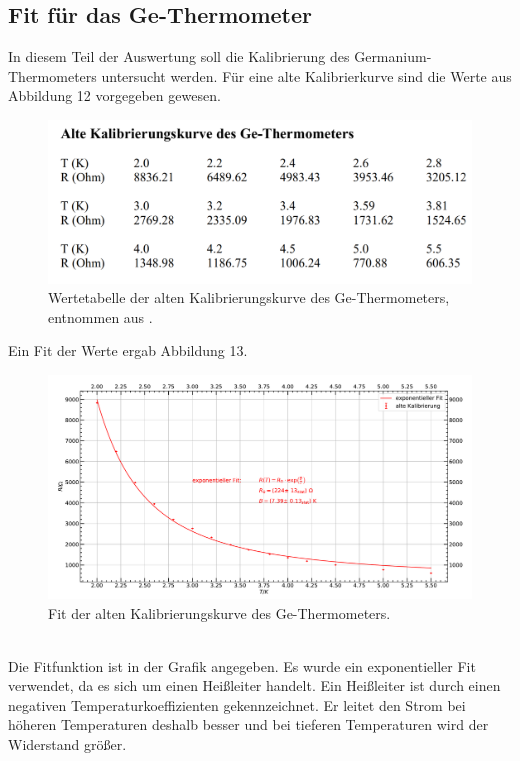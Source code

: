 \documentclass[german,  %
parskip=full,  %
]{scrartcl}
\begin{document}
\subsection{Fit für das Ge-Thermometer}
In diesem Teil der Auswertung soll die Kalibrierung des Germanium-Thermometers untersucht werden. Für eine alte Kalibrierkurve sind die Werte aus Abbildung 12 vorgegeben gewesen.
\\
\begin{figure}[h!]
\centering
\includegraphics[width=\textwidth]{werte_ge_alt}
\caption{Wertetabelle der alten Kalibrierungskurve des Ge-Thermometers, entnommen aus \cite{3}.}
\end{figure}
\newpage
Ein Fit der Werte ergab Abbildung 13.
\\
\begin{figure}[h!]
\centering
\includegraphics[width=\textwidth]{Ge_Thermometer_alte_Kalibrierung.pdf}
\caption{Fit der alten Kalibrierungskurve des Ge-Thermometers.}
\end{figure}
\\
Die Fitfunktion ist in der Grafik angegeben. Es wurde ein exponentieller Fit verwendet, da es sich um einen Heißleiter handelt. Ein Heißleiter ist durch einen negativen Temperaturkoeffizienten gekennzeichnet. Er leitet den Strom bei höheren Temperaturen deshalb besser und bei tieferen Temperaturen wird der Widerstand größer.
\end{document}
